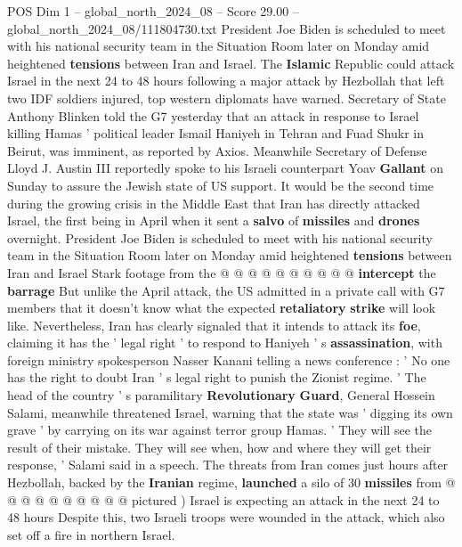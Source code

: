 \begin{textsample}{POS Dim 1 – global\_north\_2024\_08 – Score 29.00 – global\_north\_2024\_08/111804730.txt}  \label{ex:f1_pos_077}
President Joe Biden is scheduled to meet with his national security team in the Situation Room later on Monday amid heightened \textbf{tensions} between Iran and Israel.
The \textbf{Islamic} Republic could attack Israel in the next 24 to 48 hours following a major attack by Hezbollah that left two IDF soldiers injured, top western diplomats have warned.
Secretary of State Anthony Blinken told the G7 yesterday that an attack in response to Israel killing Hamas ' political leader Ismail Haniyeh in Tehran and Fuad Shukr in Beirut, was imminent, as reported by Axios.
Meanwhile Secretary of Defense Lloyd J.
Austin III reportedly spoke to his Israeli counterpart Yoav \textbf{Gallant} on Sunday to assure the Jewish state of US support.
It would be the second time during the growing crisis in the Middle East that Iran has directly attacked Israel, the first being in April when it sent a \textbf{salvo} of \textbf{missiles} and \textbf{drones} overnight.
President Joe Biden is scheduled to meet with his national security team in the Situation Room later on Monday amid heightened \textbf{tensions} between Iran and Israel Stark footage from the @ @ @ @ @ @ @ @ @ @ \textbf{intercept} the \textbf{barrage} But unlike the April attack, the US admitted in a private call with G7 members that it doesn't know what the expected \textbf{retaliatory} \textbf{strike} will look like.
Nevertheless, Iran has clearly signaled that it intends to attack its \textbf{foe}, claiming it has the ' legal right ' to respond to Haniyeh ' s \textbf{assassination}, with foreign ministry spokesperson Nasser Kanani telling a news conference : ' No one has the right to doubt Iran ' s legal right to punish the Zionist regime. ' The head of the country ' s paramilitary \textbf{Revolutionary} \textbf{Guard}, General Hossein Salami, meanwhile threatened Israel, warning that the state was ' digging its own grave ' by carrying on its war against terror group Hamas. ' They will see the result of their mistake.
They will see when, how and where they will get their response, ' Salami said in a speech.
The threats from Iran comes just hours after Hezbollah, backed by the \textbf{Iranian} regime, \textbf{launched} a silo of 30 \textbf{missiles} from @ @ @ @ @ @ @ @ @ @ pictured ) Israel is expecting an attack in the next 24 to 48 hours Despite this, two Israeli troops were wounded in the attack, which also set off a fire in northern Israel.

\end{textsample}
